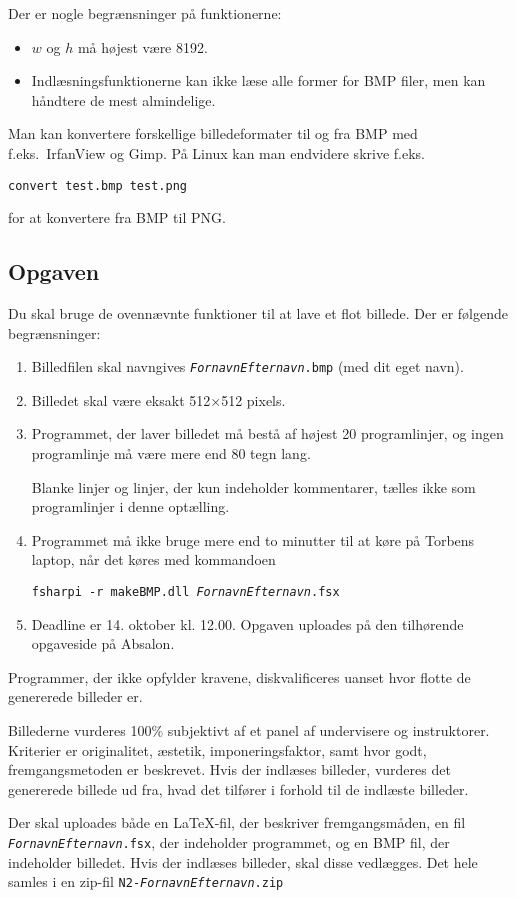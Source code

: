 \documentclass[a4paper]{article}
\begin{document}
\noindent
Der er nogle begrænsninger på funktionerne:

\begin{itemize}
\item $w$ og $h$ må højest være 8192.
\item Indlæsningsfunktionerne kan ikke læse alle former for BMP
  filer, men kan håndtere de mest almindelige.
\end{itemize}

\noindent
Man kan konvertere forskellige billedeformater til og fra BMP med
f.eks.\ IrfanView og Gimp.  På Linux kan man endvidere skrive f.eks.

\texttt{convert test.bmp test.png}

\noindent
for at konvertere fra BMP til PNG.

\subsection*{Opgaven}

Du skal bruge de ovennævnte funktioner til at lave et flot billede.
Der er følgende begrænsninger:

\begin{enumerate}[~1.]

\item Billedfilen skal navngives
  \texttt{\emph{FornavnEfternavn}.bmp} (med dit eget navn).

\item Billedet skal være eksakt 512×512 pixels.

\item Programmet, der laver billedet må bestå af højest 20
  programlinjer, og ingen programlinje må være mere end 80 tegn lang.

Blanke linjer og linjer, der kun indeholder kommentarer, tælles ikke
som programlinjer i denne optælling.

\item Programmet må ikke bruge mere end to minutter til at køre på
  Torbens laptop, når det køres med kommandoen

\texttt{fsharpi -r makeBMP.dll \emph{FornavnEfternavn}.fsx}

\item Deadline er 14. oktober kl. 12.00.  Opgaven uploades på den
  tilhørende opgaveside på Absalon.
\end{enumerate}

\noindent
Programmer, der ikke opfylder kravene, diskvalificeres uanset hvor
flotte de genererede billeder er.

Billederne vurderes 100\% subjektivt af et panel af undervisere og
instruktorer.  Kriterier er originalitet, æstetik, imponeringsfaktor,
samt hvor godt, fremgangsmetoden er beskrevet.  Hvis der indlæses
billeder, vurderes det genererede billede ud fra, hvad det tilfører i
forhold til de indlæste billeder.

Der skal uploades både en \LaTeX-fil, der beskriver fremgangsmåden, en
fil \texttt{\emph{FornavnEfternavn}.fsx}, der indeholder
programmet, og en BMP fil, der indeholder billedet. Hvis der indlæses
billeder, skal disse vedlægges.  Det hele samles i en zip-fil
\texttt{N2-\emph{FornavnEfternavn}.zip}
\end{document}

